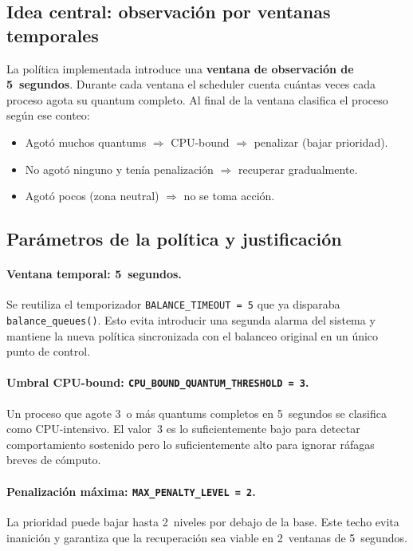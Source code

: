 \documentclass[11pt,a4paper]{article}
\begin{document}
\subsection{Idea central: observaci\'on por ventanas temporales}

La pol\'itica implementada introduce una \textbf{ventana de observaci\'on de 5~segundos}.
Durante cada ventana el scheduler cuenta cu\'antas veces cada proceso agota su quantum
completo. Al final de la ventana clasifica el proceso seg\'un ese conteo:

\begin{itemize}[leftmargin=*]
  \item Agot\'o muchos quantums $\Rightarrow$ CPU-bound $\Rightarrow$ penalizar (bajar prioridad).
  \item No agot\'o ninguno y ten\'ia penalizaci\'on $\Rightarrow$ recuperar gradualmente.
  \item Agot\'o pocos (zona neutral) $\Rightarrow$ no se toma acci\'on.
\end{itemize}

\subsection{Par\'ametros de la pol\'itica y justificaci\'on}

\paragraph{Ventana temporal: 5~segundos.}
Se reutiliza el temporizador \texttt{BALANCE\_TIMEOUT = 5} que ya disparaba
\texttt{balance\_queues()}. Esto evita introducir una segunda alarma del sistema y
mantiene la nueva pol\'itica sincronizada con el balanceo original en un \'unico punto
de control.

\paragraph{Umbral CPU-bound: \texttt{CPU\_BOUND\_QUANTUM\_THRESHOLD = 3}.}
Un proceso que agote 3~o m\'as quantums completos en 5~segundos se clasifica como
CPU-intensivo. El valor~3 es lo suficientemente bajo para detectar comportamiento
sostenido pero lo suficientemente alto para ignorar r\'afagas breves de c\'omputo.

\paragraph{Penalizaci\'on m\'axima: \texttt{MAX\_PENALTY\_LEVEL = 2}.}
La prioridad puede bajar hasta 2~niveles por debajo de la base. Este techo evita
inanici\'on y garantiza que la recuperaci\'on sea viable en 2~ventanas de 5~segundos.
\end{document}

